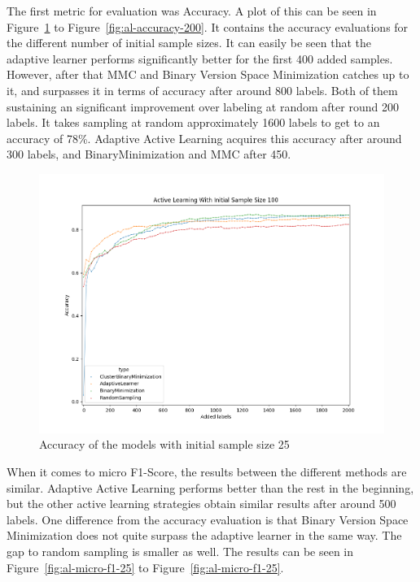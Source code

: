 The first metric for evaluation was Accuracy.
A plot of this can be seen in Figure~\ref{fig:al-accuracy-25} to Figure~\ref{fig:al-accuracy-200}.
It contains the accuracy evaluations for the different number of initial sample sizes.
It can easily be seen that the adaptive learner performs significantly better for the first 400 added samples.
However, after that MMC and Binary Version Space Minimization catches up to it, and surpasses it in terms of accuracy after around 800 labels.
Both of them sustaining an significant improvement over labeling at random after round 200 labels.
It takes sampling at random approximately 1600 labels to get to an accuracy of 78\%.
Adaptive Active Learning acquires this accuracy after around 300 labels, and BinaryMinimization and MMC after 450.

\begin{figure}
    \centering
    \includegraphics[scale=0.5]{figures/al-25-accuracy.png}
    \caption{Accuracy of the models with initial sample size 25}
    \label{fig:al-accuracy-25}
\end{figure}

When it comes to micro F1-Score, the results between the different methods are similar.
Adaptive Active Learning performs better than the rest in the beginning, but the other active learning strategies obtain similar results after around 500 labels.
One difference from the accuracy evaluation is that Binary Version Space Minimization does not quite surpass the adaptive learner in the same way.
The gap to random sampling is smaller as well.
The results can be seen in Figure~\ref{fig:al-micro-f1-25} to Figure~\ref{fig:al-micro-f1-25}.

